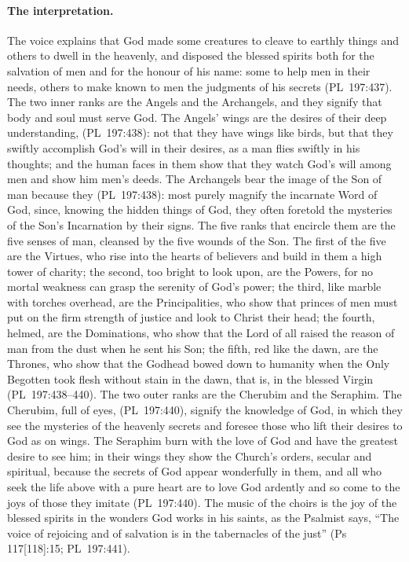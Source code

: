 \paragraph{The interpretation.} The voice explains that God made some
creatures to cleave to earthly things and others to dwell in the heavenly,
and disposed the blessed spirits both for the salvation of men and for the
honour of his name: some to help men in their needs, others to make known
to men the judgments of his secrets (PL~197:437). The two inner ranks are
the Angels and the Archangels, and they signify that body and soul must
serve God. The Angels' wings are the desires of their deep understanding,
 (PL~197:438): not that they have wings like birds, but that they
swiftly accomplish God's will in their desires, as a man flies swiftly in
his thoughts; and the human faces in them show that they watch God's will
among men and show him men's deeds. The Archangels bear the image of the Son
of man because they  (PL~197:438): most purely magnify the incarnate
Word of God, since, knowing the hidden things of God, they often foretold
the mysteries of the Son's Incarnation by their signs. The five ranks that
encircle them are the five senses of man, cleansed by the five wounds of the
Son. The first of the five are the Virtues, who rise into the hearts of
believers and build in them a high tower of charity; the second, too bright
to look upon, are the Powers, for no mortal weakness can grasp the serenity
of God's power; the third, like marble with torches overhead, are the
Principalities, who show that princes of men must put on the firm strength
of justice and look to Christ their head; the fourth, helmed, are the
Dominations, who show that the Lord of all raised the reason of man from
the dust when he sent his Son; the fifth, red like the dawn, are the
Thrones, who show that the Godhead bowed down to humanity when the Only
Begotten took flesh without stain in the dawn, that is, in the blessed
Virgin (PL~197:438--440). The two outer ranks are the Cherubim and the
Seraphim. The Cherubim, full of eyes, 
(PL~197:440), signify the knowledge of God, in which they see the mysteries
of the heavenly secrets and foresee those who lift their desires to God as
on wings. The Seraphim burn with the love of God and have the greatest
desire to see him; in their wings they show the Church's orders, secular and
spiritual, because the secrets of God appear wonderfully in them, and all
who seek the life above with a pure heart are to love God ardently and so
come to the joys of those they imitate (PL~197:440). The music of the
choirs is the joy of the blessed spirits in the wonders God works in his
saints, as the Psalmist says, ``The voice of rejoicing and of salvation is
in the tabernacles of the just'' (Ps 117[118]:15; PL~197:441).

